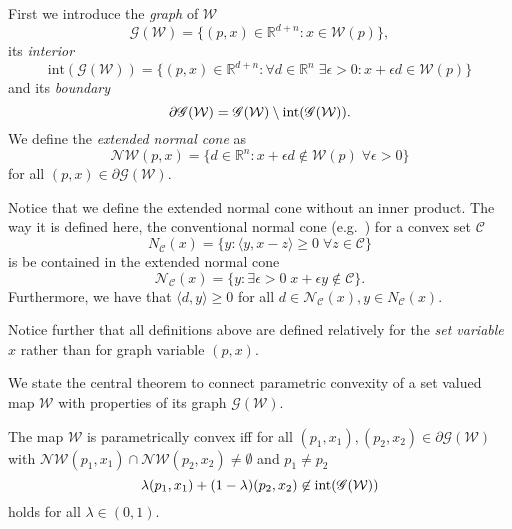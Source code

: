 %
First we introduce the \emph{graph} of $\mathcal W$
%
\[
	\mathscr G(\mathcal W) = \{(p,x) \in\mathbb R^{d+n}: x\in\mathcal W(p)\},
\]
%
its \emph{interior}
%
\[
	\text{int}(\mathscr G(\mathcal W)) = \{(p,x) \in\mathbb R^{d+n}: \forall d\in\mathbb R^n\;\exists 
	\epsilon>0 : x+\epsilon d\in \mathcal W(p)\}
\]
%
and its \emph{boundary}
\[
	\partial \mathscr G(\mathcal W) = \mathscr G(\mathcal W)\setminus \textup{int}(\mathscr G(\mathcal W)).
\]
%
We define the \emph{extended normal cone} as
%
\[
	\mathcal N\mathcal W(p,x) = \{d\in\mathbb R^n: x+\epsilon d \not\in \mathcal W(p)\; \forall \epsilon>0\}
\]
for all $(p,x)\in\partial\mathscr G(\mathcal W)$.
%
\begin{rem}
%
Notice that we define the extended normal cone without an inner product. 
%
The way it is defined here, the conventional normal cone (e.g.~\cite{Boyd:04}) for a convex set $\mathcal C$
%
\[
	N_{\mathcal C}(x) = \{y: \langle y,x-z\rangle\geq0\;\forall z\in\mathcal C\}
\]
%
is be contained in the extended normal cone
%
\[
	\mathcal N_{\mathcal C}(x) = \{y:\exists\epsilon>0\;x+\epsilon y\not\in\mathcal C\}.
\]
%
Furthermore, we have that $\langle d, y\rangle\geq0$ for all $d\in\mathcal N_{\mathcal C}(x), y\in N_{\mathcal C}(x)$.
%
\end{rem}
%
\begin{rem}
%
Notice further that all definitions above are defined relatively for the \emph{set variable} $x$ rather than for graph
variable $(p,x)$.
%
\end{rem}
%
We state the central theorem to connect parametric convexity of a set valued map $\mathcal W$ with properties of its graph
$\mathscr G(\mathcal W)$.
%
\begin{thm}\label{thm:p:convexity:graph}
The map $\mathcal W$ is parametrically convex iff for all $(p_1,x_1),(p_2,x_2)\in\partial\mathscr G(\mathcal W)$
with $\mathcal N\mathcal W(p_1,x_1)\cap\mathcal N\mathcal W(p_2,x_2)\neq\emptyset$ and $p_1\neq p_2$ 
%
\begin{equation}\label{eq:graph:def:p:convexity}
\lambda (p_1,x_1) + (1-\lambda) (p_2,x_2) \not\in\textup{int} (\mathscr G(\mathcal W))
\end{equation}
%
holds for all $\lambda\in(0,1)$.
%
\end{thm}
%
